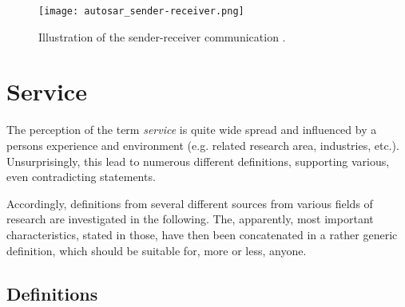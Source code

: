 \begin{figure}[!htbp]
\centering
\texttt{[image: autosar\_sender-receiver.png]}
\caption{Illustration of the sender-receiver communication \cite{autosar_intro}.}
\label{fig:autosar_sender-receiver}
\end{figure}










\section{Service}
\label{ch:service} 
The perception of the term \emph{service} is quite wide spread and influenced by a persons experience and environment (e.g. related research area, industries, etc.). Unsurprisingly, this lead to numerous different definitions, supporting various, even contradicting statements.

Accordingly, definitions from several different sources from various fields of research are investigated in the following. The, apparently, most important characteristics, stated in those, have then been concatenated in a rather generic definition, which should be suitable for, more or less, anyone.

\subsection{Definitions}

